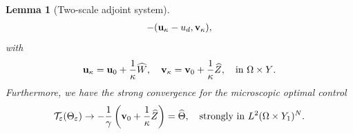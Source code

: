 \documentclass[11pt,a4paper]{article}
\numberwithin{equation}{section}
\def\clm{\color{magenta}}
\def\O{\Omega}
\def\e{\varepsilon}
\def\Te{{\cal T}_\varepsilon}
\def\D{{\mathbb{D}}}
\def\wh{\widehat }
\def\X{\times }
\def\Gu{{\bf u}}
\def\Gv{{\bf v}}
\def\GU{{\bf U}}
\newtheorem{lemma}[theorem]{Lemma}
\begin{document}
\begin{lemma}[Two-scale adjoint system]
\begin{multline*}
			-(\Gu_\kappa-u_d,\Gv_\kappa),
		\end{multline*}
		with
		$$\Gu_\kappa=\Gu_0+{1\over \kappa}\wh W,\quad \Gv_\kappa=\Gv_0+{1\over\kappa}\wh Z,\quad\text{in $\O\X Y$}.$$
		Furthermore, we have the strong convergence for the microscopic optimal control
		\begin{equation}\label{OCC03}
				\Te(\Theta_\e) \to -{1\over \gamma}\left(\Gv_0+{1\over \kappa}\wh Z\right)=\wh \Theta,\quad\text{strongly in $L^2(\O\X Y_1)^N$}.
		\end{equation}
	\end{lemma}
\end{document}
